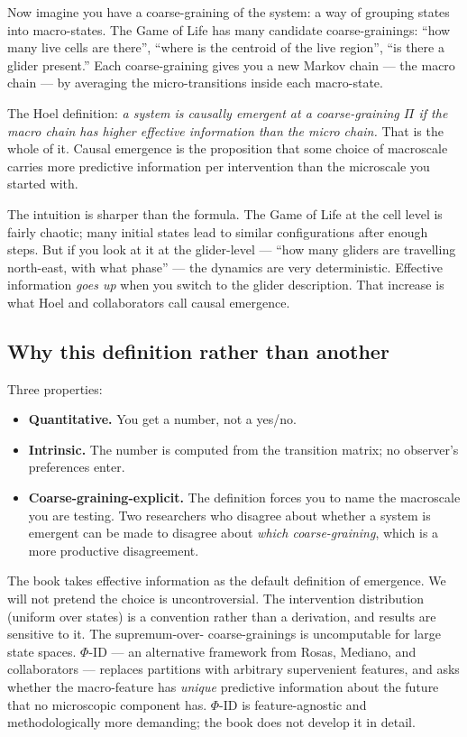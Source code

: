 Now imagine you have a coarse-graining of the system: a way of grouping
states into macro-states. The Game of Life has many candidate
coarse-grainings: ``how many live cells are there'', ``where is the
centroid of the live region'', ``is there a glider present.'' Each
coarse-graining gives you a new Markov chain --- the macro chain --- by
averaging the micro-transitions inside each macro-state.

The Hoel definition: \emph{a system is causally emergent at a
coarse-graining $\Pi$ if the macro chain has higher effective
information than the micro chain.} That is the whole of it. Causal
emergence is the proposition that some choice of macroscale carries more
predictive information per intervention than the microscale you started
with.

The intuition is sharper than the formula. The Game of Life at the cell
level is fairly chaotic; many initial states lead to similar
configurations after enough steps. But if you look at it at the
glider-level --- ``how many gliders are travelling north-east, with what
phase'' --- the dynamics are very deterministic. Effective information
\emph{goes up} when you switch to the glider description. That increase
is what Hoel and collaborators call causal emergence.

\subsection*{Why this definition rather than another}

Three properties:

\begin{itemize}[leftmargin=1.5em,itemsep=2pt]
  \item \textbf{Quantitative.} You get a number, not a yes/no.
  \item \textbf{Intrinsic.} The number is computed from the transition
    matrix; no observer's preferences enter.
  \item \textbf{Coarse-graining-explicit.} The definition forces you to
    name the macroscale you are testing. Two researchers who disagree
    about whether a system is emergent can be made to disagree about
    \emph{which coarse-graining}, which is a more productive
    disagreement.
\end{itemize}

The book takes effective information as the default definition of
emergence. We will not pretend the choice is uncontroversial. The
intervention distribution (uniform over states) is a convention rather
than a derivation, and results are sensitive to it. The supremum-over-
coarse-grainings is uncomputable for large state spaces. $\Phi$-ID --- an
alternative framework from Rosas, Mediano, and collaborators --- replaces
partitions with arbitrary supervenient features, and asks whether the
macro-feature has \emph{unique} predictive information about the future
that no microscopic component has. $\Phi$-ID is feature-agnostic and
methodologically more demanding; the book does not develop it in detail.


